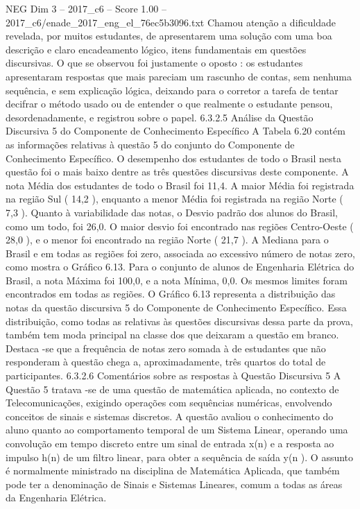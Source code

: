 \begin{textsample}{NEG Dim 3 – 2017\_c6 – Score 1.00 – 2017\_c6/enade\_2017\_eng\_el\_76ec5b3096.txt}
Chamou atenção a dificuldade revelada, por muitos estudantes, de apresentarem uma solução com uma boa descrição e claro encadeamento lógico, itens fundamentais em questões discursivas.
O que se observou foi justamente o oposto : os estudantes apresentaram respostas que mais pareciam um rascunho de contas, sem nenhuma sequência, e sem explicação lógica, deixando para o corretor a tarefa de tentar decifrar o método usado ou de entender o que realmente o estudante pensou, desordenadamente, e registrou sobre o papel. 6.3.2.5 Análise da Questão Discursiva 5 do Componente de Conhecimento Específico A Tabela 6.20 contém as informações relativas à questão 5 do conjunto do Componente de Conhecimento Específico.
O desempenho dos estudantes de todo o Brasil nesta questão foi o mais baixo dentre as três questões discursivas deste componente.
A nota Média dos estudantes de todo o Brasil foi 11,4.
A maior Média foi registrada na região Sul ( 14,2 ), enquanto a menor Média foi registrada na região Norte ( 7,3 ).
Quanto à variabilidade das notas, o Desvio padrão dos alunos do Brasil, como um todo, foi 26,0.
O maior desvio foi encontrado nas regiões Centro-Oeste ( 28,0 ), e o menor foi encontrado na região Norte ( 21,7 ).
A Mediana para o Brasil e em todas as regiões foi zero, associada ao excessivo número de notas zero, como mostra o Gráfico 6.13.
Para o conjunto de alunos de Engenharia Elétrica do Brasil, a nota Máxima foi 100,0, e a nota Mínima, 0,0.
Os mesmos limites foram encontrados em todas as regiões.
O Gráfico 6.13 representa a distribuição das notas da questão discursiva 5 do Componente de Conhecimento Específico.
Essa distribuição, como todas as relativas às questões discursivas dessa parte da prova, também tem moda principal na classe dos que deixaram a questão em branco.
Destaca -se que a frequência de notas zero somada à de estudantes que não responderam à questão chega a, aproximadamente, três quartos do total de participantes. 6.3.2.6 Comentários sobre as respostas à Questão Discursiva 5 A Questão 5 tratava -se de uma questão de matemática aplicada, no contexto de Telecomunicações, exigindo operações com sequências numéricas, envolvendo conceitos de sinais e sistemas discretos.
A questão avaliou o conhecimento do aluno quanto ao comportamento temporal de um Sistema Linear, operando uma convolução em tempo discreto entre um sinal de entrada x(n) e a resposta ao impulso h(n) de um filtro linear, para obter a sequência de saída y(n ).
O assunto é normalmente ministrado na disciplina de Matemática Aplicada, que também pode ter a denominação de Sinais e Sistemas Lineares, comum a todas as áreas da Engenharia Elétrica.

\end{textsample}
